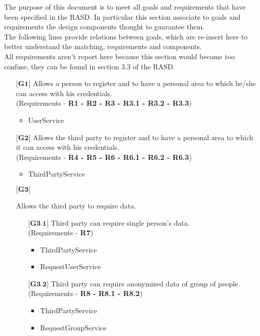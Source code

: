 The purpose of this document is to meet all goals and requirements that have been specified in the RASD. In particular this section associate to goals and requirements the design components thought to guarantee them.\\
The following lines provide relations between goals, which are re-insert here to better understand the matching, requirements and components.\\
All requirements aren't report here because this section would become too confuse, they can be found in section 3.3 of the RASD.

\begin{itemize}
	\item[${\textbf{[G1]}}$] {Allows a person to register and to have a personal area to which he/she can access with his 				credentials.\\(Requirements - \textbf{R1 - R2 - R3 - R3.1 - R3.2 - R3.3})}
		\begin{itemize}
			\item UserService	
		\end{itemize}
	\item[${\textbf{[G2]}}$] {Allows the third party to register and to have a personal area to which it can access with his 				credentials.\\(Requirements - \textbf{R4 - R5 - R6 - R6.1 - R6.2 - R6.3})}
		\begin{itemize}
			\item ThirdPartyService	
		\end{itemize}
	\item[${\textbf{[G3]}}$] {Allows the third party to require data.
				\begin{itemize}
					\item[${\textbf{[G3.1]}}$] {Third party can require single person's data.\\(Requirements - 								\textbf{R7})}
					\begin{itemize}
						\item ThirdPartyService
						\item RequestUserService	
					\end{itemize}
					\item[${\textbf{[G3.2]}}$] {Third party can require anonymized data of group of people.\\ 								(Requirements - \textbf{R8 - R8.1 - R8.2})}
					\begin{itemize}
						\item ThirdPartyService
						\item RequestGroupService	

\end{itemize}
\end{itemize}}
\end{itemize}
